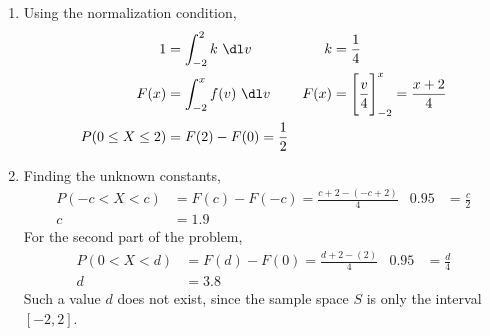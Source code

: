 \begin{enumerate}
    \item Using the normalization condition,
          \begin{align}
              1    & = \int_{-2}^{2} k\ \dl v                           &
              k    & = \frac{1}{4}                                        \\
              F(x) & = \int_{-2}^{x} f(v)\ \dl v                        &
              F(x) & = \Bigg[ \frac{v}{4} \Bigg]_{-2}^x = \frac{x+2}{4}   \\
              P(0 \leq X \leq 2)
                   & = F(2) - F(0) = \frac{1}{2}
          \end{align}
          \begin{figure}[H]
              \centering
          \end{figure}

    \item Finding the unknown constants,
          \begin{align}
              P(-c < X < c) & = F(c) - F(-c) = \frac{c+2-(-c+2)}{4} &
              0.95          & = \frac{c}{2}                           \\
              c             & = 1.9
          \end{align}
          For the second part of the problem,
          \begin{align}
              P(0 < X < d) & = F(d) - F(0) = \frac{d+2-(2)}{4} &
              0.95         & = \frac{d}{4}                       \\
              d            & = 3.8
          \end{align}
          Such a value $ d $ does not exist, since the sample space $ S $ is only the
          interval $ [-2,2] $.


\end{enumerate}

